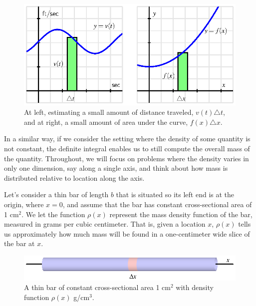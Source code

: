 \begin{figure}[h]
\begin{center}
\includegraphics{figures/6_3_VelArea.eps}
\caption{At left, estimating a small amount of distance traveled, $v(t) \triangle t$, and at right, a small amount of area under the curve, $f(x) \triangle x$.} \label{F:6.3.VelArea}
\end{center}
\end{figure}

In a similar way, if we consider the setting where the density of some quantity is not constant, the definite integral enables us to still compute the overall mass of the quantity.  Throughout, we will focus on problems where the density varies in only one dimension, say along a single axis, and think about how mass is distributed relative to location along the axis.  

Let's consider a thin bar of length $b$ that is situated so its left end is at the origin, where $x = 0$, and assume that the bar has constant cross-sectional area of 1 cm$^2$.  We let the function $\rho(x)$ represent the mass density function of the bar, measured in grams per cubic centimeter.  That is, given a location $x$, $\rho(x)$ tells us approximately how much mass will be found in a one-centimeter wide slice of the bar at $x$.

\begin{figure}[h]
\begin{center}
\includegraphics{figures/6_3_Bar.eps}
\caption{A thin bar of constant cross-sectional area 1 cm$^2$ with density function $\rho(x)$ g/cm$^3$.} \label{F:6.3.Bar}
\end{center}
\end{figure}

